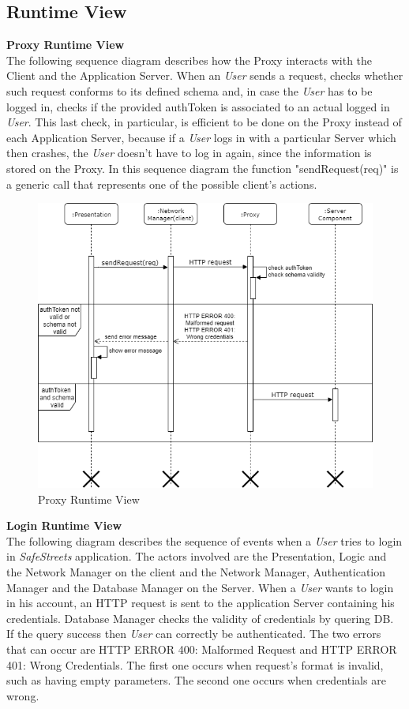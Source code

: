 \documentclass{article}
\begin{document}
\clearpage

\subsection{Runtime View}
\textbf{Proxy Runtime View}\\
The following sequence diagram describes how the Proxy interacts with the Client and the Application 
Server. When an \textit{User} sends a request, checks whether such request conforms to its defined schema and, 
in case the \textit{User} has to be logged in, checks if the provided authToken is associated to an actual 
logged in \textit{User}. This last check, in particular, is efficient to be done on the Proxy instead of each 
Application Server, because if a \textit{User} logs in with a particular Server which then crashes, the 
\textit{User} doesn't have to log in again, since the information is stored on the Proxy. In this sequence diagram
the function "sendRequest(req)" is a generic call that represents one of the possible client's actions.

\begin{figure}[H]
    \centering
    \includegraphics[scale=0.4]{img/sequence_diagrams/Proxy_sequence.png}
    \caption{Proxy Runtime View}
\end{figure}  
\clearpage
\textbf{Login Runtime View}\\
The following diagram describes the sequence of events when a \textit{User} tries to login in 
\textit{SafeStreets} application. The actors involved are the Presentation, Logic and the Network Manager on the
client and the Network Manager, Authentication Manager and the Database Manager on the Server.
When a \textit{User} wants to login in his account, an HTTP request is sent to the application Server
containing his credentials. Database Manager checks the validity of credentials by quering DB. If the query
success then \textit{User} can correctly be authenticated. The two errors that can occur are HTTP ERROR 400:
Malformed Request and HTTP ERROR 401: Wrong Credentials. The first one occurs when request's format is invalid,
such as having empty parameters. The second one occurs when credentials are wrong.   
\end{document}
